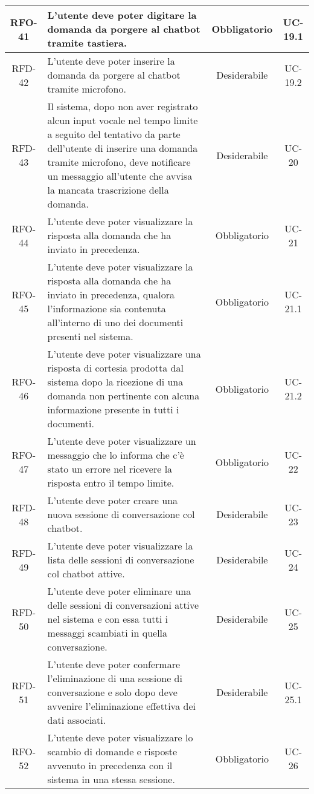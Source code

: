 \begin{xltabular}{\textwidth}{| c | X | c | c |}
    \hline
    RFO-41 & L’utente deve poter digitare la domanda da porgere al chatbot tramite tastiera. & Obbligatorio & UC-19.1 \\
    \hline
    RFD-42 & L’utente deve poter inserire la domanda da porgere al chatbot tramite microfono. & Desiderabile & UC-19.2 \\
    \hline
    RFD-43 & Il sistema, dopo non aver registrato alcun input vocale nel tempo limite a seguito del tentativo da parte dell'utente di inserire una domanda tramite microfono, deve notificare un messaggio all'utente che avvisa la mancata trascrizione della domanda. & Desiderabile & UC-20 \\
    \hline
    RFO-44 & L’utente deve poter visualizzare la risposta alla domanda che ha inviato in precedenza. & Obbligatorio & UC-21 \\
    \hline
    RFO-45 & L’utente deve poter visualizzare la risposta alla domanda che ha inviato in precedenza, qualora l'informazione sia contenuta all'interno di uno dei documenti presenti nel sistema. & Obbligatorio & UC-21.1 \\
    \hline
    RFO-46 & L’utente deve poter visualizzare una risposta di cortesia prodotta dal sistema dopo la ricezione di una domanda non pertinente con alcuna informazione presente in tutti i documenti. & Obbligatorio & UC-21.2 \\
    \hline
    RFO-47 & L'utente deve poter visualizzare un messaggio che lo informa che c'è stato un errore nel ricevere la risposta entro il tempo limite. & Obbligatorio & UC-22 \\
    \hline
    RFD-48 & L’utente deve poter creare una nuova sessione di conversazione col chatbot. & Desiderabile & UC-23 \\
    \hline
    RFD-49 & L’utente deve poter visualizzare la lista delle sessioni di conversazione col chatbot attive. & Desiderabile & UC-24 \\
    \hline
    RFD-50 & L’utente deve poter eliminare una delle sessioni di conversazioni attive nel sistema e con essa tutti i messaggi scambiati in quella conversazione. & Desiderabile & UC-25 \\
    \hline
    RFD-51 & L’utente deve poter confermare l’eliminazione di una sessione di conversazione e solo dopo deve avvenire l'eliminazione effettiva dei dati associati. & Desiderabile & UC-25.1 \\
    \hline
    RFO-52 & L’utente deve poter visualizzare lo scambio di domande e risposte avvenuto in precedenza con il sistema in una stessa sessione. & Obbligatorio & UC-26 \\

\end{xltabular}
